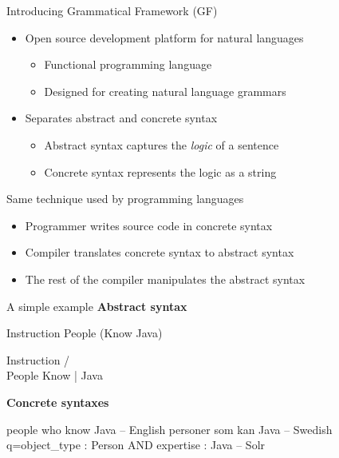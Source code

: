 \begin{frame}{Introducing Grammatical Framework (GF)} 
         \begin{itemize}
           \item Open source development platform for natural languages \pause
           \begin{itemize}
              \item Functional programming language \pause
              \item Designed for creating natural language grammars
           \end{itemize}\pause
           \item Separates abstract and concrete syntax \pause
           \begin{itemize}
              \item Abstract syntax captures the \emph{logic} of a sentence \pause
              \item Concrete syntax represents the logic as a string
           \end{itemize}\pause
         \end{itemize}
         
           \begin{block}{Same technique used by programming languages}
             \begin{itemize}
               \item Programmer writes source code in concrete syntax \pause
               \item Compiler translates concrete syntax to abstract syntax \pause
               \item The rest of the compiler manipulates the abstract syntax
             \end{itemize}
         \end{block}
         
\end{frame}

\begin{frame}[fragile]{A simple example}
\textbf{Abstract syntax}
\begin{semiverbatim}
Instruction People (Know Java)

    Instruction
   /           \\
People        Know
                |
              Java
\end{semiverbatim}\pause


\textbf{Concrete syntaxes}
\begin{semiverbatim}
people who know Java                           -- English
personer som kan Java                          -- Swedish
q=object_type : Person AND expertise : Java    -- Solr
\end{semiverbatim}
\end{frame}

